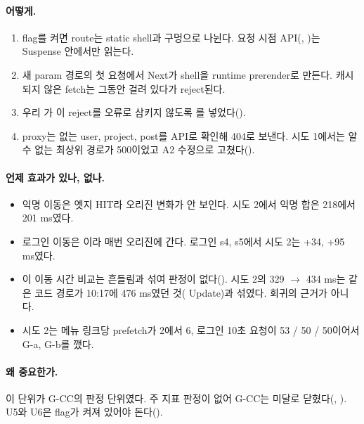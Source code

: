 \paragraph{어떻게.}
\begin{enumerate}[nosep]
  \item flag를 켜면 route는 static shell과 구멍으로 나뉜다. 요청 시점 API(, )는 Suspense 안에서만 읽는다.
  \item 새 param 경로의 첫 요청에서 Next가 shell을 runtime prerender로 만든다. 캐시되지 않은 fetch는 그동안 걸려 있다가 reject된다.
  \item 우리 가 이 reject를 오류로 삼키지 않도록 를 넣었다().
  \item proxy는 없는 user, project, post를 API로 확인해 404로 보낸다. 시도 1에서는 알 수 없는 최상위 경로가 500이었고 A2 수정으로 고쳤다().
\end{enumerate}

\paragraph{언제 효과가 있나, 없나.}
\begin{itemize}[nosep]
  \item 익명 이동은 엣지 HIT라 오리진 변화가 안 보인다. 시도 2에서 익명 합은 218에서 201 ms였다.
  \item 로그인 이동은 이라 매번 오리진에 간다. 로그인 s4, s5에서 시도 2는 +34, +95 ms였다.
  \item 이 이동 시간 비교는 흔들림과 섞여 판정이 없다(). 시도 2의 329 $\to$ 434 ms는 같은 코드 경로가 10:17에 476 ms였던 것( Update)과 섞였다. 회귀의 근거가 아니다.
  \item 시도 2는 메뉴 링크당 prefetch가 2에서 6, 로그인 10초 요청이 53 / 50 / 50이어서 G-a, G-b를 깼다.
\end{itemize}

\paragraph{왜 중요한가.}
이 단위가 G-CC의 판정 단위였다. 주 지표 판정이 없어 G-CC는 미달로 닫혔다(, ).
U5와 U6은 flag가 켜져 있어야 돈다().

